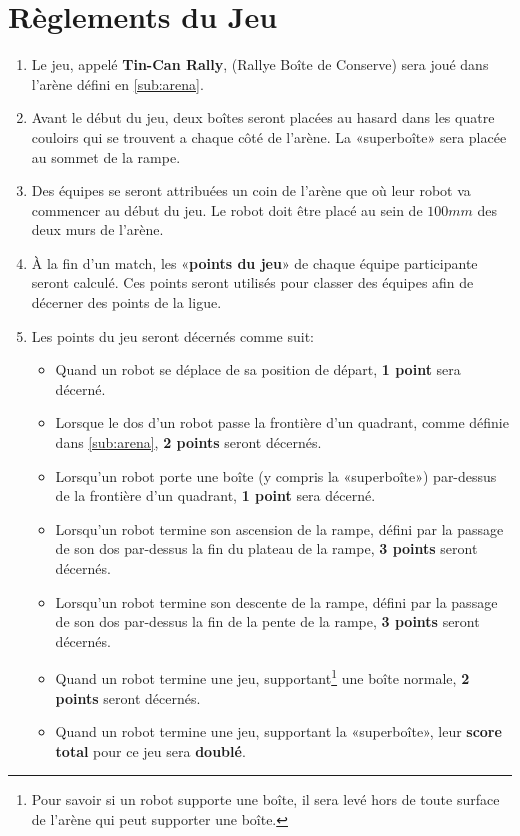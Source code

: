\section {Règlements du Jeu}
\label{game-rules}

\begin{enumerate}
\item Le jeu, appelé \textbf{Tin-Can Rally}, (Rallye Boîte de Conserve) sera joué dans l'arène défini en \autoref{sub:arena}.
\item Avant le début du jeu, deux boîtes seront placées au hasard dans les quatre couloirs qui se trouvent a chaque côté de l'arène. La «superboîte» sera placée au sommet de la rampe.
\item Des équipes se seront attribuées un coin de l'arène que où leur robot va commencer au début du jeu.
Le robot doit être placé au sein de $100mm$ des deux murs de l'arène.
\item À la fin d'un match, les «\textbf{points du jeu}» de chaque équipe participante seront calculé.
 Ces points seront utilisés pour classer des équipes afin de décerner des points de la ligue.

\item Les points du jeu seront décernés comme suit:

\begin{itemize}
\item Quand un robot se déplace de sa position de départ, \textbf{1 point} sera décerné.
\item Lorsque le dos d'un robot passe la frontière d'un quadrant, comme définie dans \autoref{sub:arena}, \textbf{2 points} seront décernés.
\item Lorsqu'un robot porte une boîte (y compris la «superboîte») par-dessus de la frontière d'un quadrant, \textbf{1 point} sera décerné.
\item Lorsqu'un robot termine son ascension de la rampe, défini par la passage de son dos par-dessus la fin du plateau de la rampe, \textbf{3 points} seront décernés.
\item Lorsqu'un robot termine son descente de la rampe, défini par la passage de son dos par-dessus la fin de la pente de la rampe, \textbf{3 points} seront décernés.
\item Quand un robot termine une jeu, supportant\footnote{Pour savoir si un robot supporte une boîte, il sera levé hors de toute surface de l'arène qui peut supporter une boîte.} une boîte normale, \textbf{2 points} seront décernés.
\item Quand un robot termine une jeu, supportant la «superboîte», leur \textbf{score total} pour ce jeu sera \textbf{doublé}.
\end{itemize}


\end{enumerate}
